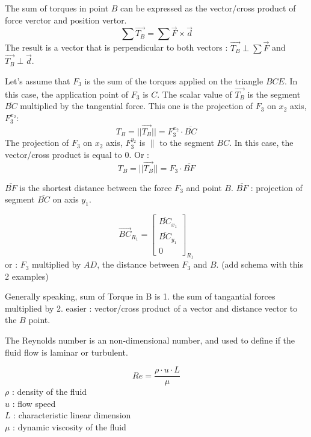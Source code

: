 \documentclass[12pt,a4paper]{article}
\begin{document}
	The sum of torques in point $B$ can be expressed as the vector/cross product of force verctor and position vertor. 
	\begin{equation}
		\sum \vec{T_B} = \sum \vec{F} \times \vec{d}
	\end{equation}
	The result is a vector that is perpendicular to both vectors : 
	$\vec{T_B} \perp \sum \vec{F}$ and 
	$\vec{T_B} \perp \vec{d}$.
	
	Let's assume that $F_3$ is the sum of the torques applied on the triangle $BCE$. In this case, the application point of $F_3$ is $C$. The scalar value of $\vec{T_B}$ is  the segment $\overline{BC}$ multiplied by the tangential force. This one is the projection of $F_3$ on $x_2$ axis, $F_3^{x_2}$:
	\begin{equation}
		T_B=||\vec{T_B}|| = F_3^{x_2} \cdot \overline{BC}
	\end{equation}
	The projection of $F_3$ on $x_2$ axis, $F_3^{y_2}$ is $\parallel$ to the segment $BC$. In this case, the vector/cross product is equal to $0$.
	Or : 
	\begin{equation}
		T_B=||\vec{T_B}|| = F_3 \cdot \overline{BF}
	\end{equation}
	
	$\overline{B F}$ is the shortest distance between the force $F_3$ and point $B$.
	$\overline{B F}$ : projection of segment $\overline{BC}$ on axis $y_1$. 
	
	\begin{equation}
		\vec{BC}_{R_{1}}=
		\begin{bmatrix}
			\overline{BC}_{x_1} \\
			\overline{BC}_{y_1}\\
			0
		\end{bmatrix}_{R_{1}} 
	\end{equation}
	or : $F_3$ multiplied by $AD$, the distance between $F_3$ and $B$. (add schema with this 2 examples)
	
	Generally speaking, sum of Torque in B is 
	1. the sum of tangantial forces multiplied by
	2. easier : vector/cross product of a vector and distance vector to the $B$ point.  
	
	The Reynolds number is an non-dimensional number, and used to define if the fluid flow is laminar or turbulent. 
	
	\begin{equation}
		Re = \frac{\rho \cdot u \cdot L}{\mu}
	\end{equation}
	$\rho$ : density of the fluid\\
	$u$ : flow speed\\
	$L$ : characteristic linear dimension\\
	$\mu$ : dynamic viscosity of the fluid\\
	
\end{document}
